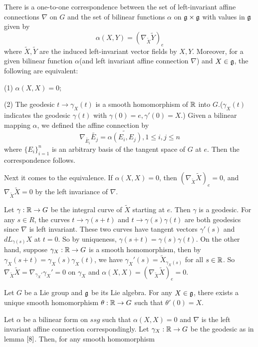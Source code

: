 \begin{lemma}\label{8}
	There is a one-to-one correspondence between the set of
	left-invariant affine connections $\nabla$ on $G$ and the set
	of bilinear functions $\alpha$ on ${\mathfrak g}\times{\mathfrak g}$ with
	values in ${\mathfrak g}$ given by
	\[ \alpha(X, Y)=(\nabla_{\tilde X}\tilde Y)_e \]
	where $\tilde X, \tilde Y$ are the induced left-invariant vector fields by
	$X, Y$. Moreover, for a given bilinear function $\alpha$(and
	left invariant affine connection $\nabla$) and $X\in {\mathfrak g}$,
	the following are equivalent:
	
	(1) $\alpha(X, X)=0$;
	
	(2) The geodesic $t\to \gamma_X(t)$ is a smooth homomorphism
	of ${\mathbb R}$ into $G$.($\gamma_X(t)$ indicates the geodesic
	$\gamma(t)$ with $\gamma(0)=e, \gamma'(0)=X$.)
	\bproof
	Given a bilinear mapping $\alpha$, we defined the affine
	connection by
	\[
	\nabla_{\tilde{E_i}}\tilde{E_j}=\tilde{\alpha(E_i,E_j)},
	1\le i,j\le n
	\]
	where $\{E_i\}_{i=1}^n$ is an arbitrary basis of the tangent
	space of $G$ at $e$. Then the correspondence follows.
	
	Next it comes to the equivalence. If $\alpha(X,X)=0$, then
	$(\nabla_{\tilde X}\tilde{X})_e=0$, and $\nabla_{\tilde
	X}\tilde{X}=0$ by the left invariance of $\nabla$.
	
	Let $\gamma:{\mathbb R}\to G$ be the integral curve of $\tilde{X}$
	starting at $e$. Then $\gamma $ is a geodesic. For any $s\in
	R$, the curves $t\to \gamma(s+t)$ and $t\to
	\gamma(s)\gamma(t)$ are both geodesics since $\nabla$ is left
	invariant. These two curves have tangent vectors $\gamma'(s)$
	and $dL_{\gamma(s)}X$ at $t=0$. So by uniqueness,
	$\gamma(s+t)=\gamma(s)\gamma(t)$. On the other hand, suppose
	$\gamma_X:{\mathbb R}\to G$ is a smooth homomorphism, then by
	$\gamma_X(s+t)=\gamma_X(s)\gamma_X(t)$, we have
	$\gamma_X'(s)=\tilde X_{\gamma_X(s)}$ for all $s\in {\mathbb R}$. So
	$\nabla_{\tilde X}\tilde{X}=\nabla_{\gamma_X'}\gamma_X'=0$ on
	$\gamma_X$ and $\alpha(X,X)=(\nabla_{\tilde
	X}\tilde{X})_e=0$.
	\eproof
\end{lemma}
\begin{corollary}\label{9}
	Let $G$ be a Lie group and ${\mathfrak g}$ be its Lie algebra. For any
	$X\in {\mathfrak g}$, there exists a unique smooth homomorphism
	$\theta:{\mathbb R}\to G$ such that $\theta'(0)=X$.
\end{corollary}
\bproof
Let $\alpha$ be a bilinear form on $ssg$ such that
$\alpha(X,X)=0$ and $\nabla$ is the left invariant affine
connection correspondingly. Let $\gamma_X:{\mathbb R}\to G$ be the
geodesic as in lemma $\ref{8}$. Then, for any smooth homomorphism
